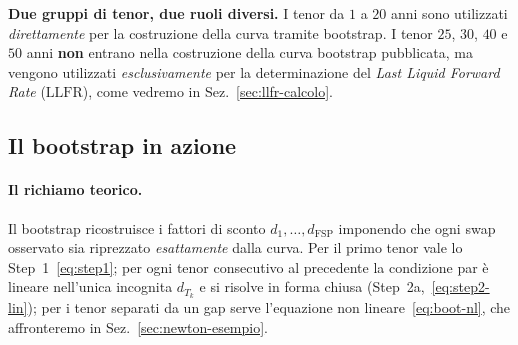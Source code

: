 \documentclass[11pt,a4paper]{article}
\theoremstyle{plain}
\theoremstyle{definition}
\theoremstyle{remark}
\newcommand{\LLFR}{\mathrm{LLFR}}
\newcommand{\FSP}{\mathrm{FSP}}
\begin{document}




\begin{warningbox}
\textbf{Due gruppi di tenor, due ruoli diversi.} I tenor da $1$ a $20$ anni sono utilizzati
\emph{direttamente} per la costruzione della curva tramite bootstrap. I tenor $25$, $30$, $40$
e $50$ anni \textbf{non} entrano nella costruzione della curva bootstrap pubblicata, ma
vengono utilizzati \emph{esclusivamente} per la determinazione del \emph{Last Liquid Forward
Rate} ($\LLFR$), come vedremo in Sez.~\ref{sec:llfr-calcolo}.
\end{warningbox}

\subsection{Il bootstrap in azione}
\label{sec:boot-azione}

\paragraph{Il richiamo teorico.}
Il bootstrap ricostruisce i fattori di sconto $d_1,\ldots,d_{\FSP}$ imponendo che ogni swap
osservato sia riprezzato \emph{esattamente} dalla curva. Per il primo tenor vale lo
Step~1~\eqref{eq:step1}; per ogni tenor consecutivo al precedente la condizione par \`e
lineare nell'unica incognita $d_{T_k}$ e si risolve in forma chiusa
(Step~2a,~\eqref{eq:step2-lin}); per i tenor separati da un gap serve l'equazione non
lineare~\eqref{eq:boot-nl}, che affronteremo in Sez.~\ref{sec:newton-esempio}.
\end{document}
